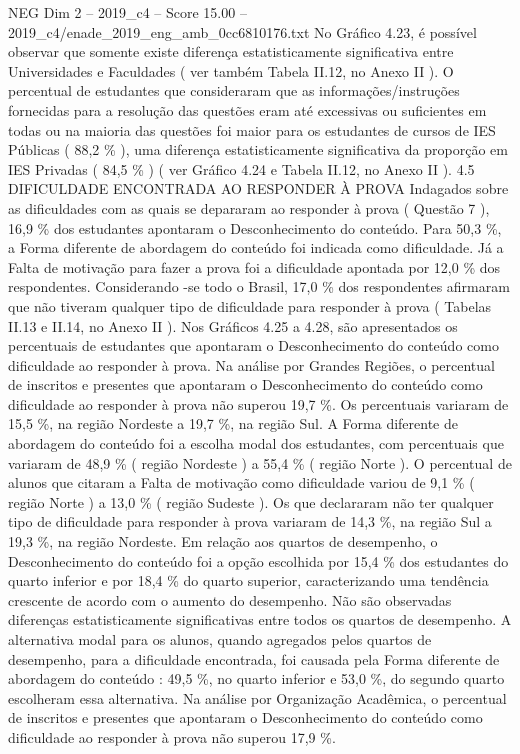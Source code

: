 \begin{textsample}{NEG Dim 2 – 2019\_c4 – Score 15.00 – 2019\_c4/enade\_2019\_eng\_amb\_0cc6810176.txt}
No Gráfico 4.23, é possível observar que somente existe diferença estatisticamente significativa entre Universidades e Faculdades ( ver também Tabela II.12, no Anexo II ).
O percentual de estudantes que consideraram que as informações/instruções fornecidas para a resolução das questões eram até excessivas ou suficientes em todas ou na maioria das questões foi maior para os estudantes de cursos de IES Públicas ( 88,2 \% ), uma diferença estatisticamente significativa da proporção em IES Privadas ( 84,5 \% ) ( ver Gráfico 4.24 e Tabela II.12, no Anexo II ). 4.5 DIFICULDADE ENCONTRADA AO RESPONDER À PROVA Indagados sobre as dificuldades com as quais se depararam ao responder à prova ( Questão 7 ), 16,9 \% dos estudantes apontaram o Desconhecimento do conteúdo.
Para 50,3 \%, a Forma diferente de abordagem do conteúdo foi indicada como dificuldade.
Já a Falta de motivação para fazer a prova foi a dificuldade apontada por 12,0 \% dos respondentes.
Considerando -se todo o Brasil, 17,0 \% dos respondentes afirmaram que não tiveram qualquer tipo de dificuldade para responder à prova ( Tabelas II.13 e II.14, no Anexo II ).
Nos Gráficos 4.25 a 4.28, são apresentados os percentuais de estudantes que apontaram o Desconhecimento do conteúdo como dificuldade ao responder à prova.
Na análise por Grandes Regiões, o percentual de inscritos e presentes que apontaram o Desconhecimento do conteúdo como dificuldade ao responder à prova não superou 19,7 \%.
Os percentuais variaram de 15,5 \%, na região Nordeste a 19,7 \%, na região Sul.
A Forma diferente de abordagem do conteúdo foi a escolha modal dos estudantes, com percentuais que variaram de 48,9 \% ( região Nordeste ) a 55,4 \% ( região Norte ).
O percentual de alunos que citaram a Falta de motivação como dificuldade variou de 9,1 \% ( região Norte ) a 13,0 \% ( região Sudeste ).
Os que declararam não ter qualquer tipo de dificuldade para responder à prova variaram de 14,3 \%, na região Sul a 19,3 \%, na região Nordeste.
Em relação aos quartos de desempenho, o Desconhecimento do conteúdo foi a opção escolhida por 15,4 \% dos estudantes do quarto inferior e por 18,4 \% do quarto superior, caracterizando uma tendência crescente de acordo com o aumento do desempenho.
Não são observadas diferenças estatisticamente significativas entre todos os quartos de desempenho.
A alternativa modal para os alunos, quando agregados pelos quartos de desempenho, para a dificuldade encontrada, foi causada pela Forma diferente de abordagem do conteúdo : 49,5 \%, no quarto inferior e 53,0 \%, do segundo quarto escolheram essa alternativa.
Na análise por Organização Acadêmica, o percentual de inscritos e presentes que apontaram o Desconhecimento do conteúdo como dificuldade ao responder à prova não superou 17,9 \%.

\end{textsample}
